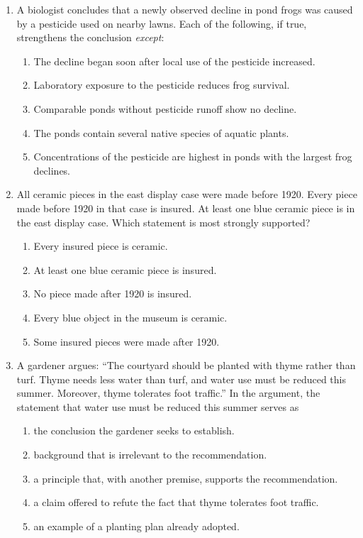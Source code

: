 \begin{enumerate}
\item A biologist concludes that a newly observed decline in pond frogs was
caused by a pesticide used on nearby lawns. Each of the following, if true,
strengthens the conclusion \emph{except}:
  \begin{enumerate}
  \item The decline began soon after local use of the pesticide increased.
  \item Laboratory exposure to the pesticide reduces frog survival.
  \item Comparable ponds without pesticide runoff show no decline.
  \item The ponds contain several native species of aquatic plants.
  \item Concentrations of the pesticide are highest in ponds with the largest
        frog declines.
  \end{enumerate}

\item All ceramic pieces in the east display case were made before 1920. Every
piece made before 1920 in that case is insured. At least one blue ceramic piece
is in the east display case. Which statement is most strongly supported?
  \begin{enumerate}
  \item Every insured piece is ceramic.
  \item At least one blue ceramic piece is insured.
  \item No piece made after 1920 is insured.
  \item Every blue object in the museum is ceramic.
  \item Some insured pieces were made after 1920.
  \end{enumerate}

\item A gardener argues: ``The courtyard should be planted with thyme rather
than turf. Thyme needs less water than turf, and water use must be reduced this
summer. Moreover, thyme tolerates foot traffic.'' In the argument, the statement
that water use must be reduced this summer serves as
  \begin{enumerate}
  \item the conclusion the gardener seeks to establish.
  \item background that is irrelevant to the recommendation.
  \item a principle that, with another premise, supports the recommendation.
  \item a claim offered to refute the fact that thyme tolerates foot traffic.
  \item an example of a planting plan already adopted.
  \end{enumerate}


\end{enumerate}
